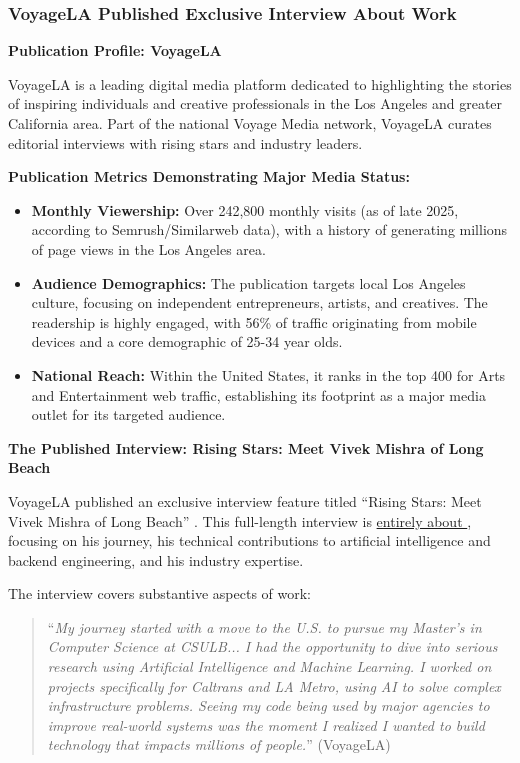 
\subsubsection{VoyageLA Published Exclusive Interview About \drs Work}
\label{media:voyagela}

\textbf{Publication Profile: VoyageLA}

VoyageLA is a leading digital media platform dedicated to highlighting the stories of inspiring individuals and creative professionals in the Los Angeles and greater California area. Part of the national Voyage Media network, VoyageLA curates editorial interviews with rising stars and industry leaders. 

\textbf{Publication Metrics Demonstrating Major Media Status:}
\begin{itemize}
    \item \textbf{Monthly Viewership:} Over 242,800 monthly visits (as of late 2025, according to Semrush/Similarweb data), with a history of generating millions of page views in the Los Angeles area.
    \item \textbf{Audience Demographics:} The publication targets local Los Angeles culture, focusing on independent entrepreneurs, artists, and creatives. The readership is highly engaged, with 56\% of traffic originating from mobile devices and a core demographic of 25-34 year olds.
    \item \textbf{National Reach:} Within the United States, it ranks in the top 400 for Arts and Entertainment web traffic, establishing its footprint as a major media outlet for its targeted audience.
\end{itemize}

\textbf{The Published Interview: Rising Stars: Meet Vivek Mishra of Long Beach}

VoyageLA published an exclusive interview feature titled ``Rising Stars: Meet Vivek Mishra of Long Beach'' \cite{PM13}. This full-length interview is \underline{entirely about \dr}, focusing on his journey, his technical contributions to artificial intelligence and backend engineering, and his industry expertise.

The interview covers substantive aspects of \drs work:

\begin{quote}
``\textit{My journey started with a move to the U.S. to pursue my Master's in Computer Science at CSULB... I had the opportunity to dive into serious research using Artificial Intelligence and Machine Learning. I worked on projects specifically for Caltrans and LA Metro, using AI to solve complex infrastructure problems. Seeing my code being used by major agencies to improve real-world systems was the moment I realized I wanted to build technology that impacts millions of people.}'' (VoyageLA)
\end{quote}

